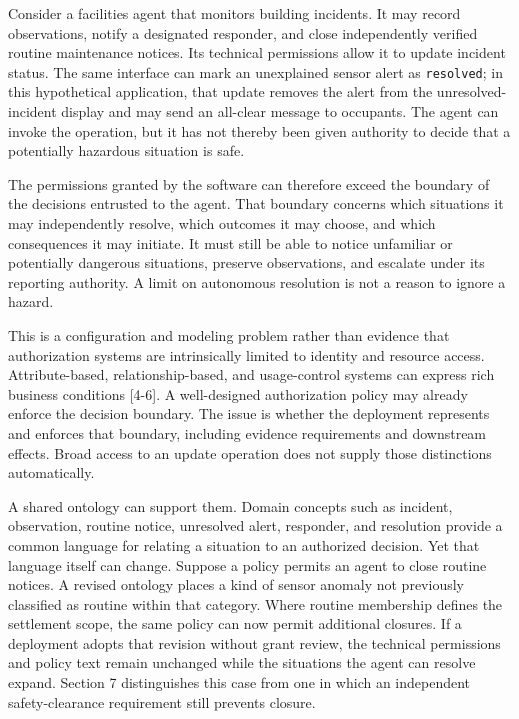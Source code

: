 \documentclass[
  english,
  12pt,
  a4paper,
  preprint,
  numbers,
  nopreprintline]{elsarticle}
\begin{document}
Consider a facilities agent that monitors building incidents. It may
record observations, notify a designated responder, and close
independently verified routine maintenance notices. Its technical
permissions allow it to update incident status. The same interface can
mark an unexplained sensor alert as \texttt{resolved}; in this
hypothetical application, that update removes the alert from the
unresolved-incident display and may send an all-clear message to
occupants. The agent can invoke the operation, but it has not thereby
been given authority to decide that a potentially hazardous situation is
safe.

The permissions granted by the software can therefore exceed the
boundary of the decisions entrusted to the agent. That boundary concerns
which situations it may independently resolve, which outcomes it may
choose, and which consequences it may initiate. It must still be able to
notice unfamiliar or potentially dangerous situations, preserve
observations, and escalate under its reporting authority. A limit on
autonomous resolution is not a reason to ignore a hazard.

This is a configuration and modeling problem rather than evidence that
authorization systems are intrinsically limited to identity and resource
access. Attribute-based, relationship-based, and usage-control systems
can express rich business conditions {[}4-6{]}. A well-designed
authorization policy may already enforce the decision boundary. The
issue is whether the deployment represents and enforces that boundary,
including evidence requirements and downstream effects. Broad access to
an update operation does not supply those distinctions automatically.

A shared ontology can support them. Domain concepts such as incident,
observation, routine notice, unresolved alert, responder, and resolution
provide a common language for relating a situation to an authorized
decision. Yet that language itself can change. Suppose a policy permits
an agent to close routine notices. A revised ontology places a kind of
sensor anomaly not previously classified as routine within that
category. Where routine membership defines the settlement scope, the
same policy can now permit additional closures. If a deployment adopts
that revision without grant review, the technical permissions and policy
text remain unchanged while the situations the agent can resolve expand.
Section 7 distinguishes this case from one in which an independent
safety-clearance requirement still prevents closure.
\end{document}
